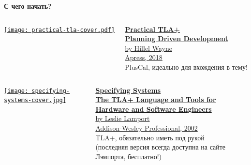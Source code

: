 \documentclass[
  11pt,aspectratio=1610,pdf,hyperref={unicode,colorlinks=false}
]{beamer}
\begin{document}
\begin{frame}
  \centering\Large\bf{С чего начать?}
\end{frame}

\begin{frame}[c]
  \begin{columns}
    \begin{column}{.45\textwidth}
      \centering
      \href{https://www.apress.com/gp/book/9781484238288}{%
        \texttt{[image: practical-tla-cover.pdf]}
      }
    \end{column}
    \begin{column}{.45\textwidth}
      \href{https://www.apress.com/gp/book/9781484238288}{%
        {\Large\bf Practical TLA+}\\
        {\large\bf Planning Driven Development}\\
        {\normalsize by Hillel Wayne\\Apress, 2018}
      }\\
      \vspace{3ex}
      \large
      PlusCal, идеально для вхождения в тему!
    \end{column}
  \end{columns}
\end{frame}

\begin{frame}[c]
  \begin{columns}
    \begin{column}{.45\textwidth}
      \centering
      \href{https://lamport.azurewebsites.net/tla/book.html\#download}{%
        \texttt{[image: specifying-systems-cover.jpg]}
      }
    \end{column}
    \begin{column}{.45\textwidth}
      \href{https://lamport.azurewebsites.net/tla/book.html\#download}{%
        {\Large\bf Specifying Systems}\\
        {\large\bf The TLA+ Language and Tools for Hardware and Software Engineers}\\
        {\normalsize by Leslie Lamport\\Addison-Wesley Professional, 2002}
      }\\
      \vspace{3ex}
      \large
      TLA+, обязательно иметь под рукой\\
      \vspace{3ex}
      (последняя версия всегда доступна на сайте Лэмпорта, бесплатно!)
    \end{column}
  \end{columns}
\end{frame}
\end{document}
